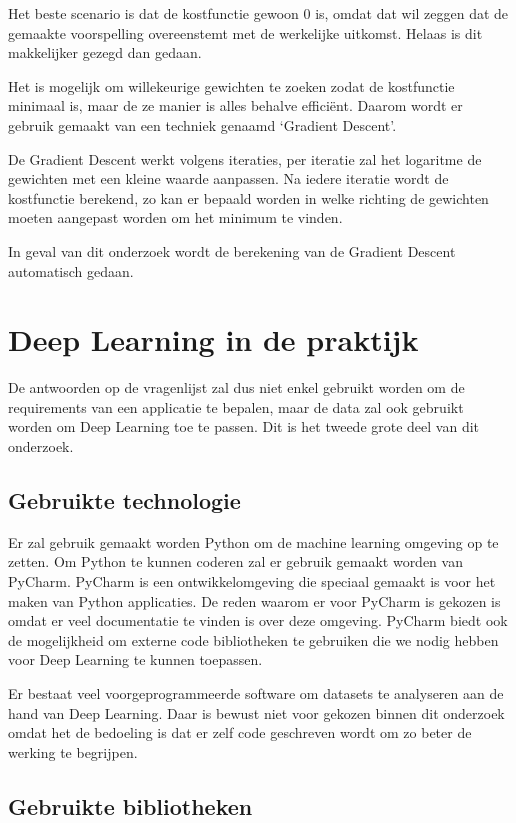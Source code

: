 Het beste scenario is dat de kostfunctie gewoon 0 is, omdat dat wil zeggen dat de gemaakte voorspelling overeenstemt met de werkelijke uitkomst. Helaas is dit makkelijker gezegd dan gedaan. 

Het is mogelijk om willekeurige gewichten te zoeken zodat de kostfunctie minimaal is, maar de ze manier is alles behalve efficiënt. Daarom wordt er gebruik gemaakt van een techniek genaamd ‘Gradient Descent’. 

De Gradient Descent werkt volgens iteraties, per iteratie zal het logaritme de gewichten met een kleine waarde aanpassen. Na iedere iteratie wordt de kostfunctie berekend, zo kan er bepaald worden in welke richting de gewichten moeten aangepast worden om het minimum te vinden.

In geval van dit onderzoek wordt de berekening van de Gradient Descent automatisch gedaan.

\section{Deep Learning in de praktijk}

De antwoorden op de vragenlijst zal dus niet enkel gebruikt worden om de requirements van een applicatie te bepalen, maar de data zal ook gebruikt worden om Deep Learning toe te passen. Dit is het tweede grote deel van dit onderzoek.

\subsection{Gebruikte technologie}

Er zal gebruik gemaakt worden Python om de machine learning omgeving op te zetten. Om Python te kunnen coderen zal er gebruik gemaakt worden van PyCharm. PyCharm is een ontwikkelomgeving die speciaal gemaakt is voor het maken van Python applicaties. 
\newpage
De reden waarom er voor PyCharm is gekozen is omdat er veel documentatie te vinden is over deze omgeving. PyCharm biedt ook de mogelijkheid om externe code bibliotheken te gebruiken die we nodig hebben voor Deep Learning te kunnen toepassen.

Er bestaat veel voorgeprogrammeerde software om datasets te analyseren aan de hand van Deep Learning. Daar is bewust niet voor gekozen binnen dit onderzoek omdat het de bedoeling is dat er zelf code geschreven wordt om zo beter de werking te begrijpen.

\subsection{Gebruikte bibliotheken}

